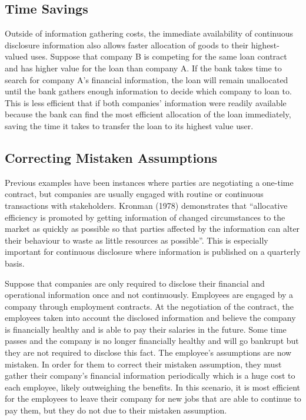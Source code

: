 \documentclass[
  12pt,
  letterpaper,
  DIV=11,
  numbers=noendperiod]{scrartcl}
\begin{document}
\hypertarget{time-savings}{%
\subsection{Time Savings}\label{time-savings}}

Outside of information gathering costs, the immediate availability of
continuous disclosure information also allows faster allocation of goods
to their highest-valued uses. Suppose that company B is competing for
the same loan contract and has higher value for the loan than company A.
If the bank takes time to search for company A's financial information,
the loan will remain unallocated until the bank gathers enough
information to decide which company to loan to. This is less efficient
that if both companies' information were readily available because the
bank can find the most efficient allocation of the loan immediately,
saving the time it takes to transfer the loan to its highest value user.

\hypertarget{correcting-mistaken-assumptions}{%
\subsection{Correcting Mistaken
Assumptions}\label{correcting-mistaken-assumptions}}

Previous examples have been instances where parties are negotiating a
one-time contract, but companies are usually engaged with routine or
continuous transactions with stakeholders. Kronman (1978) demonstrates
that ``allocative efficiency is promoted by getting information of
changed circumstances to the market as quickly as possible so that
parties affected by the information can alter their behaviour to waste
as little resources as possible''. This is especially important for
continuous disclosure where information is published on a quarterly
basis.

Suppose that companies are only required to disclose their financial and
operational information once and not continuously. Employees are engaged
by a company through employment contracts. At the negotiation of the
contract, the employees taken into account the disclosed information and
believe the company is financially healthy and is able to pay their
salaries in the future. Some time passes and the company is no longer
financially healthy and will go bankrupt but they are not required to
disclose this fact. The employee's assumptions are now mistaken. In
order for them to correct their mistaken assumption, they must gather
their company's financial information periodically which is a huge cost
to each employee, likely outweighing the benefits. In this scenario, it
is most efficient for the employees to leave their company for new jobs
that are able to continue to pay them, but they do not due to their
mistaken assumption.
\end{document}
